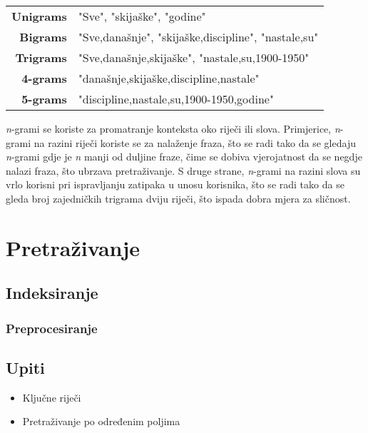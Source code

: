 \documentclass[11pt]{scrreprt}
\begin{document}
\begin{center}
  \begin{tabular}{rl}
    \textbf{Unigrams} & "Sve", "skijaške", "godine"                         \\
    \textbf{Bigrams}  & "Sve,današnje", "skijaške,discipline", "nastale,su" \\
    \textbf{Trigrams} & "Sve,današnje,skijaške", "nastale,su,1900-1950"     \\
    \textbf{4-grams}  & "današnje,skijaške,discipline,nastale"              \\
    \textbf{5-grams}  & "discipline,nastale,su,1900-1950,godine"            \\
  \end{tabular}
\end{center}

\textit{n}-grami se koriste za promatranje konteksta oko riječi ili slova. Primjerice, \textit{n}-grami na razini riječi koriste se za nalaženje fraza, što se radi tako da se gledaju \textit{n}-grami gdje je \textit{n} manji od duljine fraze, čime se dobiva vjerojatnost da se negdje nalazi fraza, što ubrzava pretraživanje. S druge strane, \textit{n}-grami na razini slova su vrlo korisni pri ispravljanju zatipaka u unosu korisnika, što se radi tako da se gleda broj zajedničkih trigrama dviju riječi, što ispada dobra mjera za sličnost.

\chapter{Pretraživanje}

\section{Indeksiranje}

\subsection{Preprocesiranje}

\section{Upiti}

\begin{itemize}
  \item{Ključne riječi}
  \item{Pretraživanje po određenim poljima}
\end{itemize}
\end{document}
